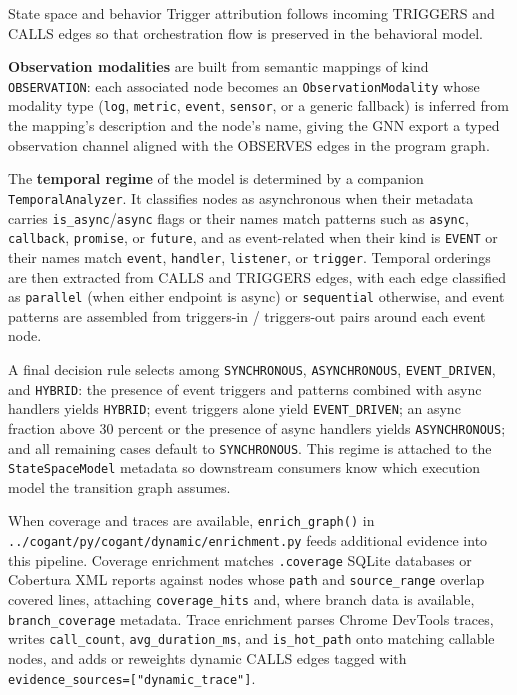 \documentclass[
  ignorenonframetext,
]{beamer}
\begin{document}
\begin{frame}[fragile]{State space and behavior}
Trigger attribution follows incoming TRIGGERS and CALLS edges so that
orchestration flow is preserved in the behavioral model.

\textbf{Observation modalities} are built from semantic mappings of kind
\texttt{OBSERVATION}: each associated node becomes an
\texttt{ObservationModality} whose modality type (\texttt{log},
\texttt{metric}, \texttt{event}, \texttt{sensor}, or a generic fallback)
is inferred from the mapping's description and the node's name, giving
the GNN export a typed observation channel aligned with the OBSERVES
edges in the program graph.

The \textbf{temporal regime} of the model is determined by a companion
\texttt{TemporalAnalyzer}. It classifies nodes as asynchronous when
their metadata carries \texttt{is\_async}/\texttt{async} flags or their
names match patterns such as \texttt{async}, \texttt{callback},
\texttt{promise}, or \texttt{future}, and as event-related when their
kind is \texttt{EVENT} or their names match \texttt{event},
\texttt{handler}, \texttt{listener}, or \texttt{trigger}. Temporal
orderings are then extracted from CALLS and TRIGGERS edges, with each
edge classified as \texttt{parallel} (when either endpoint is async) or
\texttt{sequential} otherwise, and event patterns are assembled from
triggers-in / triggers-out pairs around each event node.

A final decision rule selects among \texttt{SYNCHRONOUS},
\texttt{ASYNCHRONOUS}, \texttt{EVENT\_DRIVEN}, and \texttt{HYBRID}: the
presence of event triggers and patterns combined with async handlers
yields \texttt{HYBRID}; event triggers alone yield
\texttt{EVENT\_DRIVEN}; an async fraction above 30 percent or the
presence of async handlers yields \texttt{ASYNCHRONOUS}; and all
remaining cases default to \texttt{SYNCHRONOUS}. This regime is attached
to the \texttt{StateSpaceModel} metadata so downstream consumers know
which execution model the transition graph assumes.

When coverage and traces are available, \texttt{enrich\_graph()} in
\texttt{../cogant/py/cogant/dynamic/enrichment.py} feeds additional
evidence into this pipeline. Coverage enrichment matches
\texttt{.coverage} SQLite databases or Cobertura XML reports against
nodes whose \texttt{path} and \texttt{source\_range} overlap covered
lines, attaching \texttt{coverage\_hits} and, where branch data is
available, \texttt{branch\_coverage} metadata. Trace enrichment parses
Chrome DevTools traces, writes \texttt{call\_count},
\texttt{avg\_duration\_ms}, and \texttt{is\_hot\_path} onto matching
callable nodes, and adds or reweights dynamic CALLS edges tagged with
\texttt{evidence\_sources={[}"dynamic\_trace"{]}}.


\end{frame}
\end{document}
